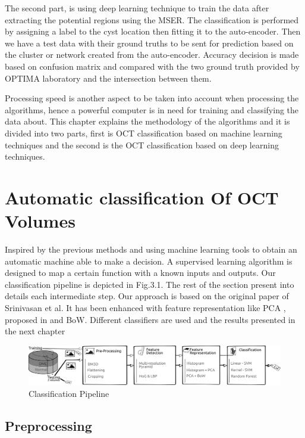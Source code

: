 The second part, is using deep learning technique to train the data after extracting the potential regions using the MSER.
The classification is performed by assigning a label to the cyst location then fitting it to the auto-encoder.
Then we have a test data with their ground truths to be sent for prediction based on the cluster or network created from the auto-encoder.
Accuracy decision is made based on confusion matrix and compared with the two ground truth provided by OPTIMA laboratory and the intersection between them.  

Processing speed is another aspect to be taken into account when processing the algorithms, hence a powerful computer is in need for training and classifying the data about.
This chapter explains the methodology of the algorithms and it is divided into two parts, first is OCT classification based on machine learning techniques and the second is the OCT classification based on deep learning techniques. 

\section{Automatic classification Of OCT Volumes}

Inspired by the previous methods and using machine learning tools to obtain an automatic machine able to make a decision.
A supervised learning algorithm is designed to map a certain function with a known inputs and outputs.  
Our classification pipeline is depicted in Fig.3.1.
The rest of the section present into details each intermediate step.
Our approach is based on the original paper of Srinivasan et al\cite{srinivasan2014fully}.
It has been enhanced with feature representation like PCA , proposed in  \cite{venhuizen2015automated} and BoW.
Different classifiers are used and the results presented in the next chapter

\begin{figure}[htb]
        \centering
        \includegraphics[width = 1\textwidth]{figures/Khaled-ICPR-method.png} %
  \caption{Classification Pipeline}
  \label{fig:Classification Pipeline}
\end{figure} 

\subsection{Preprocessing}

